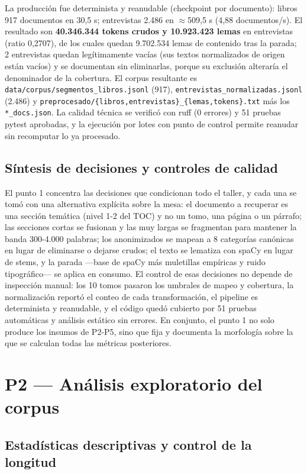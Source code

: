 \documentclass[11pt]{tg_usta}
\begin{document}
La producción fue determinista y reanudable (checkpoint por documento): libros 917 documentos en 30,5 s; entrevistas 2.486 en $\approx$509,5 s (4,88 documentos/s). El resultado son \textbf{40.346.344 tokens crudos y 10.923.423 lemas} en entrevistas (ratio 0,2707), de los cuales quedan 9.702.534 lemas de contenido tras la parada; 2 entrevistas quedan legítimamente vacías (sus textos normalizados de origen están vacíos) y se documentan sin eliminarlas, porque su exclusión alteraría el denominador de la cobertura. El corpus resultante es \texttt{data/corpus/segmentos\_libros.jsonl} (917), \texttt{entrevistas\_normalizadas.jsonl} (2.486) y \texttt{preprocesado/\{libros,entrevistas\}\_\{lemas,tokens\}.txt} más los \texttt{*\_docs.json}. La calidad técnica se verificó con ruff (0 errores) y 51 pruebas pytest aprobadas, y la ejecución por lotes con punto de control permite reanudar sin recomputar lo ya procesado.

\subsection{Síntesis de decisiones y controles de calidad}

El punto 1 concentra las decisiones que condicionan todo el taller, y cada una se tomó con una alternativa explícita sobre la mesa: el documento a recuperar es una sección temática (nivel 1-2 del TOC) y no un tomo, una página o un párrafo; las secciones cortas se fusionan y las muy largas se fragmentan para mantener la banda 300-4.000 palabras; los anonimizados se mapean a 8 categorías canónicas en lugar de eliminarse o dejarse crudos; el texto se lematiza con spaCy en lugar de stems, y la parada ---base de spaCy más muletillas empíricas y ruido tipográfico--- se aplica en consumo. El control de esas decisiones no depende de inspección manual: los 10 tomos pasaron los umbrales de mapeo y cobertura, la normalización reportó el conteo de cada transformación, el pipeline es determinista y reanudable, y el código quedó cubierto por 51 pruebas automáticas y análisis estático sin errores. En conjunto, el punto 1 no solo produce los insumos de P2-P5, sino que fija y documenta la morfología sobre la que se calculan todas las métricas posteriores.


\section{P2 --- Análisis exploratorio del corpus}\label{sec:p2}

\subsection{Estadísticas descriptivas y control de la longitud}
\end{document}
